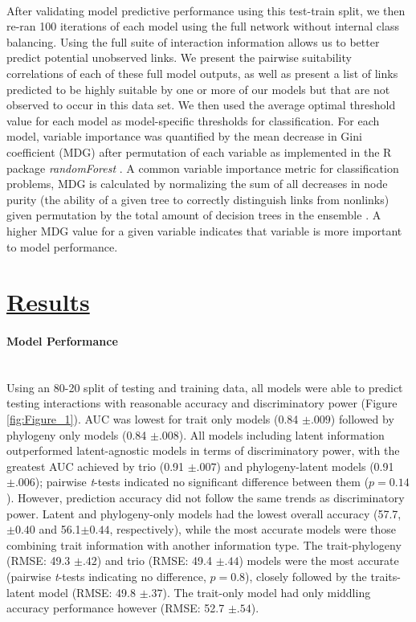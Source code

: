 \paragraph{}
After validating model predictive performance using this test-train split, we then re-ran 100 iterations of each model using the full network without internal class balancing. Using the full suite of interaction information allows us to better predict potential unobserved links. We present the pairwise suitability correlations of each of these full model outputs, as well as present a list of links predicted to be highly suitable by one or more of our models but that are not observed to occur in this data set. We then used the average optimal threshold value for each model as model-specific thresholds for classification. For each model, variable importance was quantified by the mean decrease in Gini coefficient (MDG) after permutation of each variable as implemented in the R package \textit{randomForest} \parencite{randomForest}. A common variable importance metric for classification problems, MDG is calculated by normalizing the sum of all decreases in node purity (the ability of a given tree to correctly distinguish links from nonlinks) given permutation by the total amount of decision trees in the ensemble \parencite{calle2011stability, khalilia2011predicting}. A higher MDG value for a given variable indicates that variable is more important to model performance. 






\section*{\textbf{\underline{Results}}}
\paragraph{Model Performance}\mbox{}\\ 
Using an 80-20 split of testing and training data, all models were able to predict testing interactions with reasonable accuracy and discriminatory power (Figure \ref{fig:Figure_1}). AUC was lowest for trait only models (0.84 $\pm.009$) followed by phylogeny only models (0.84 $\pm .008$). All models including latent information outperformed latent-agnostic models in terms of discriminatory power, with the greatest AUC achieved by trio (0.91 $\pm .007$) and phylogeny-latent models (0.91 $\pm .006$); pairwise \emph{t}-tests indicated no significant difference between them ($p = 0.14$). However, prediction accuracy did not follow the same trends as discriminatory power. Latent and phylogeny-only models had the lowest overall accuracy (57.7, $\pm 0.40$ and 56.1$\pm 0.44$, respectively), while the most accurate models were those combining trait information with another information type. The trait-phylogeny (RMSE: 49.3 $\pm .42$) and trio (RMSE: 49.4 $\pm .44$) models were the most accurate (pairwise \emph{t}-tests indicating no difference, $p=0.8$), closely followed by the traits-latent model (RMSE: 49.8 $\pm .37$). The trait-only model had only middling accuracy performance however (RMSE: 52.7 $\pm .54$).

